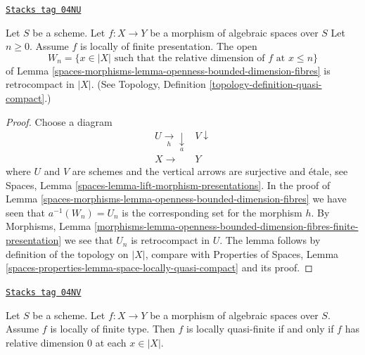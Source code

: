 \begin{lemma}
\label{spaces-morphisms-lemma-openness-bounded-dimension-fibres-finite-presentation}
\href{https://stacks.math.columbia.edu/tag/04NU}{\texttt{Stacks tag 04NU}}

Let $S$ be a scheme.
Let $f : X \to Y$ be a morphism of algebraic spaces over $S$
Let $n \geq 0$. Assume $f$ is locally of finite presentation.
The open
$$
W_n = \{x \in |X|
\text{ such that the relative dimension of }f\text{ at } x \leq n\}
$$
of Lemma \ref{spaces-morphisms-lemma-openness-bounded-dimension-fibres}
is retrocompact in $|X|$. (See
Topology, Definition \ref{topology-definition-quasi-compact}.)
\end{lemma}

\begin{proof}
Choose a diagram
$$
\begin{array}{cc}U \underset{h}{\longrightarrow}\underset{a}{\downarrow} & V \downarrow \\ X \longrightarrow & Y\end{array}
$$
where $U$ and $V$ are schemes and the vertical arrows are surjective and
\'etale, see
Spaces, Lemma \ref{spaces-lemma-lift-morphism-presentations}.
In the proof of
Lemma \ref{spaces-morphisms-lemma-openness-bounded-dimension-fibres}
we have seen that $a^{-1}(W_n) = U_n$ is the corresponding set
for the morphism $h$. By
Morphisms, Lemma
\ref{morphisms-lemma-openness-bounded-dimension-fibres-finite-presentation}
we see that $U_n$ is retrocompact in $U$.
The lemma follows by definition of the topology on $|X|$, compare with
Properties of Spaces,
Lemma \ref{spaces-properties-lemma-space-locally-quasi-compact}
and its proof.
\end{proof}

\begin{lemma}
\label{spaces-morphisms-lemma-locally-quasi-finite-rel-dimension-0}
\href{https://stacks.math.columbia.edu/tag/04NV}{\texttt{Stacks tag 04NV}}

Let $S$ be a scheme.
Let $f : X \to Y$ be a morphism of algebraic spaces over $S$.
Assume $f$ is locally of finite type.
Then $f$ is locally quasi-finite if and only if $f$ has relative
dimension $0$ at each $x \in |X|$.
\end{lemma}

